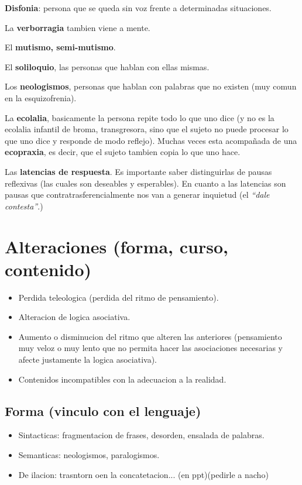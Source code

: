 \documentclass[12pt,a4paper]{article}
\begin{document}
\textbf{Disfonia}: persona que se queda sin voz frente a determinadas situaciones. 

La \textbf{verborragia} tambien viene a mente. 

El \textbf{mutismo, semi-mutismo}.

El \textbf{soliloquio}, las personas que hablan con ellas mismas. 

Los \textbf{neologismos}, personas que hablan con palabras que no existen (muy comun en la esquizofrenia).

La \textbf{ecolalia}, basicamente la persona repite todo lo que uno dice (y no es la ecolalia infantil de broma, transgresora, sino que el sujeto no puede procesar lo que uno dice y responde de modo reflejo). Muchas veces esta acompañada de una \textbf{ecopraxia}, es decir, que el sujeto tambien copia lo que uno hace. 

Las \textbf{latencias de respuesta}. Es importante saber distinguirlas de pausas reflexivas (las cuales son deseables y esperables). En cuanto a las latencias son pausas que contratrasferencialmente nos van a generar inquietud (el \textit{\enquote{dale contesta}}.)

\section{Alteraciones (forma, curso, contenido)}%
\label{sec:alteraciones_forma_curso_contenido_}

\begin{itemize}
	\item Perdida teleologica (perdida del ritmo de pensamiento).
	\item Alteracion de logica asociativa.
	\item Aumento o disminucion del ritmo que alteren las anteriores (pensamiento muy veloz o muy lento que no permita hacer las asociaciones necesarias y afecte justamente la logica asociativa).
	\item Contenidos incompatibles con la adecuacion a la realidad. 
\end{itemize}

\subsection{Forma (vinculo con el lenguaje)}%
\label{ssub:forma_vinculo_con_el_lenguaje_}

\begin{itemize}
	\item Sintacticas: fragmentacion de frases, desorden, ensalada de palabras.
	\item Semanticas: neologismos, paralogismos.
	\item De ilacion: trasntorn oen la concatetacion... (en ppt)(pedirle a nacho)
\end{itemize}
\end{document}
